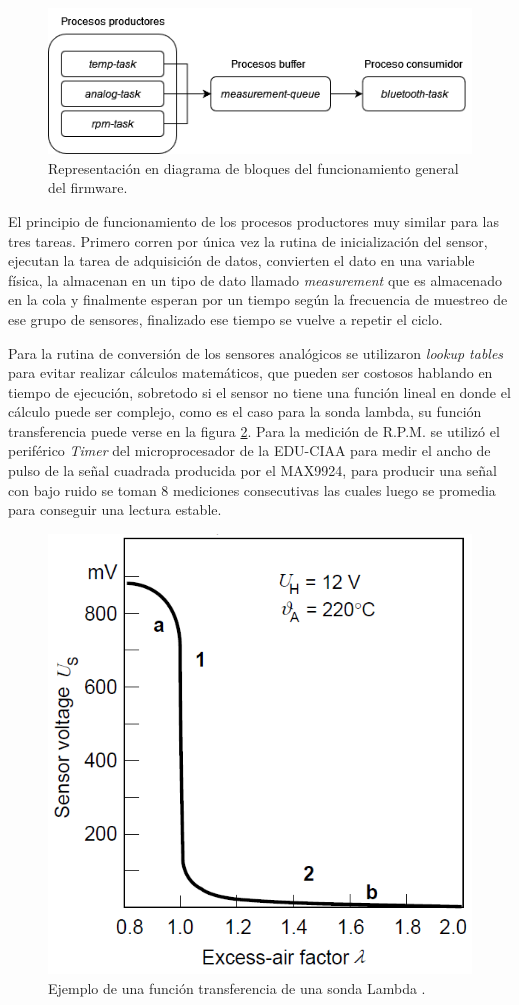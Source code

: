 \begin{figure}[htpb]
\centering
\includegraphics[width=.8\textwidth]{./Figures/diagrama-firmware.png}
\caption{Representación en diagrama de bloques del funcionamiento general del firmware.}
\label{fig:diagrama-firmware}
\end{figure}

El principio de funcionamiento de los procesos productores muy similar para las tres tareas. Primero corren por única vez la rutina de inicialización del sensor, ejecutan la tarea de adquisición de datos, convierten el dato en una variable física, la almacenan en un tipo de dato llamado \textit{measurement} que es almacenado en la cola y finalmente esperan por un tiempo según la frecuencia de muestreo de ese grupo de sensores, finalizado ese tiempo se vuelve a repetir el ciclo.

Para la rutina de conversión de los sensores analógicos se utilizaron \textit{lookup tables} para evitar realizar cálculos matemáticos, que pueden ser costosos hablando en tiempo de ejecución, sobretodo si el sensor no tiene una función lineal en donde el cálculo puede ser complejo, como es el caso para la sonda lambda, su función transferencia puede verse en la figura \ref{fig:funcion-lambda}. Para la medición de R.P.M. se utilizó el periférico \textit{Timer} del microprocesador de la EDU-CIAA para medir el ancho de pulso de la señal cuadrada producida por el MAX9924, para producir una señal con bajo ruido se toman 8 mediciones consecutivas las cuales luego se promedia para conseguir una lectura estable.

\begin{figure}[htpb]
\centering
\includegraphics[width=.55\textwidth]{./Figures/funcion-lambda.png}
\caption{Ejemplo de una función transferencia de una sonda Lambda \protect\footnotemark[3].}
\label{fig:funcion-lambda}
\end{figure}

